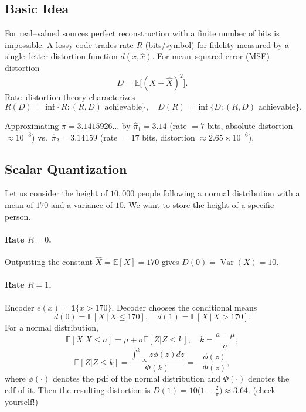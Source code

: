 \subsection{Basic Idea}   \label{subsec:lossy_intro}

For real–valued sources perfect reconstruction with a finite number of
bits is impossible.  
A lossy code trades rate \(R\) (bits/symbol) for fidelity measured by
a single–letter distortion function \(d(x,\widehat x)\).
For mean–squared error (MSE) distortion
\[
D=\mathbb{E}\bigl[(X-\widehat{X})^2\bigr].
\]
Rate–distortion theory characterizes
\[
R(D)=\inf\{R:(R,D)\text{ achievable}\},\quad
D(R)=\inf\{D:(R,D)\text{ achievable}\}.
\]

\begin{example}
Approximating
\(\pi=3.1415926\ldots\) by  
\(\widehat\pi_1=3.14\) (rate \(=7\) bits, absolute distortion \(\approx10^{-3}\))  
vs.\ \(\widehat\pi_2=3.14159\) (rate \(=17\) bits, distortion
\(\approx2.65\times10^{-6}\)).
\end{example}

\subsection{Scalar Quantization}              \label{subsec:scalar_quant}

Let us consider the height of $10,000$ people following a normal distribution with a mean of $170$ and a variance of $10$. We want to store the height of a specific person.

\paragraph{Rate \(R=0\).}
Outputting the constant \(\widehat{X}=\mathbb{E}[X]=170\) gives
\(D(0)=\operatorname{Var}(X)=10\).

\paragraph{Rate \(R=1\).}
Encoder
\(
e(x)=\mathbf 1\{x>170\}.
\)
Decoder chooses the conditional means
\[
d(0)=\mathbb{E}[X\,|\,X\leq170],\quad
d(1)=\mathbb{E}[X\,|\,X>170].
\]
For a normal distribution, $$\mathbb{E}[X|X\leq a]=\mu+\sigma\mathbb{E}[Z|Z\leq k],\quad k=\frac{a-\mu}{\sigma},$$
$$\mathbb{E}[Z|Z\leq k] = \frac{\int_{-\infty}^kz\phi(z)dz}{\Phi(k)}=-\frac{\phi(z)}{\Phi(z)},$$
where $\phi(\cdot)$ denotes the pdf of the normal distribution and $
\Phi(\cdot)$ denotes the cdf of it. Then the resulting distortion is
\(
D(1)=10\bigl(1-\tfrac2\pi\bigr)\approx3.64.
\) (check yourself!)

